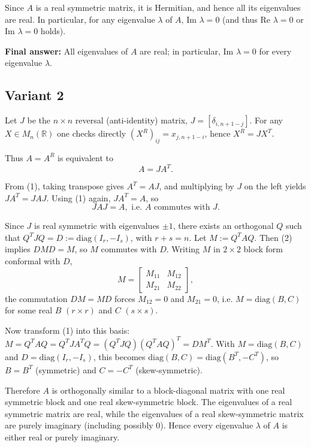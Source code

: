 \documentclass[12pt,a4paper]{article}
\theoremstyle{definition}
\begin{document}
    Since $A$ is a real symmetric matrix, it is Hermitian, and hence all its eigenvalues are real. In particular, for any eigenvalue $\lambda$ of $A$, $\text{Im } \lambda = 0$ (and thus $\text{Re } \lambda = 0$ or $\text{Im } \lambda = 0$ holds).

    \textbf{Final answer:} All eigenvalues of $A$ are real; in particular, $\text{Im } \lambda = 0$ for every eigenvalue $\lambda$.
    \subsection{Variant 2}
    Let $J$ be the $n \times n$ reversal (anti-identity) matrix, $J = [\delta_{i,n+1-j}]$. For any $X \in M_n(\mathbb{R})$ one checks directly
    $(X^R)_{ij} = x_{j,n+1-i}$, hence $X^R = J X^T$.

    Thus $A = A^R$ is equivalent to
    \begin{equation}
        A = J A^T. \tag{1}
    \end{equation}

    From (1), taking transpose gives $A^T = A J$, and multiplying by $J$ on the left yields
    $J A^T = J A J$. Using (1) again, $J A^T = A$, so
    \begin{equation}
        J A J = A, \text{ i.e. } A \text{ commutes with } J. \tag{2}
    \end{equation}

    Since $J$ is real symmetric with eigenvalues $\pm 1$, there exists an orthogonal $Q$ such that
    $Q^T J Q = D := \text{diag}(I_r, -I_s)$, with $r + s = n$.
    Let $M := Q^T A Q$. Then (2) implies $D M D = M$, so $M$ commutes with $D$. Writing $M$ in $2 \times 2$ block form conformal with $D$,
    \[
        M = \begin{bmatrix} M_{11} & M_{12} \\ M_{21} & M_{22} \end{bmatrix},
    \]
    the commutation $D M = M D$ forces $M_{12} = 0$ and $M_{21} = 0$, i.e.
    $M = \text{diag}(B, C)$ for some real $B$ $(r \times r)$ and $C$ $(s \times s)$.

    Now transform (1) into this basis:
    $M = Q^T A Q = Q^T J A^T Q = (Q^T J Q) (Q^T A Q)^T = D M^T$.
    With $M = \text{diag}(B, C)$ and $D = \text{diag}(I_r, -I_s)$, this becomes
    $\text{diag}(B, C) = \text{diag}(B^T, -C^T)$,
    so
    $B = B^T$ (symmetric) and $C = -C^T$ (skew-symmetric).

    Therefore $A$ is orthogonally similar to a block-diagonal matrix with one real symmetric block and one real skew-symmetric block. The eigenvalues of a real symmetric matrix are real, while the eigenvalues of a real skew-symmetric matrix are purely imaginary (including possibly 0). Hence every eigenvalue $\lambda$ of $A$ is either real or purely imaginary.
\end{document}
